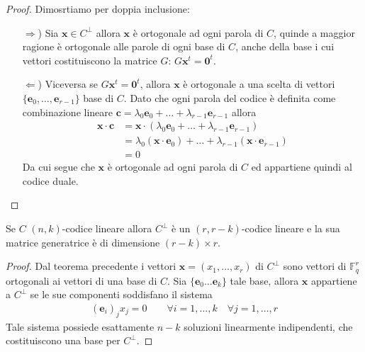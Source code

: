 \begin{proof}
   Dimosrtiamo per doppia inclusione:
   \begin{itemize}
   \item[$\Rightarrow$)] Sia $\mathbf{x} \in C^{\perp}$ allora $\mathbf{x}$ è ortogonale ad ogni parola di $C$, quinde a maggior ragione è ortogonale alle parole di ogni base di $C$, anche della base i cui vettori costituiscono la matrice $G$: $G \mathbf{x}^{t} = \mathbf{0}^{t}$.
   \item[$\Leftarrow$)] Viceversa se $G \mathbf{x}^{t} = \mathbf{0}^{t}$, allora $\mathbf{x}$ è ortogonale a una scelta di vettori $\lbrace \mathbf{e}_{0}, \dots , \mathbf{e}_{r-1} \rbrace$ base di $C$. Dato che ogni parola del codice è definita come combinazione lineare  $\mathbf{c} = \lambda_{0} \mathbf{e}_{0} + \dots + \lambda_{r-1} \mathbf{e}_{r-1}$ allora
   \begin{align*}
      \mathbf{x} \cdot \mathbf{c} 
      &= \mathbf{x} \cdot ( \lambda_{0} \mathbf{e}_{0} + \dots + \lambda_{r-1} \mathbf{e}_{r-1}) \\
      &= \lambda_{0} (\mathbf{x} \cdot  \mathbf{e}_{0}) + \dots + \lambda_{r-1} (\mathbf{x} \cdot \mathbf{e}_{r-1})\\
      &= 0
   \end{align*}
   Da cui segue che $\mathbf{x}$ è ortogonale ad ogni parola di $C$ ed appartiene quindi al codice duale.
\end{itemize}
\end{proof}
\begin{corollario}
   Se $C$ $(n,k)$-codice lineare allora $C^{\perp}$ è un $(r,r-k)$-codice lineare e la sua matrice generatrice è di dimensione $(r-k)\times r$.
\end{corollario}
\begin{proof}
   Dal teorema precedente i vettori $\mathbf{x} = (x_{1}, \dots , x_{r})$ di $C^{\perp}$ sono vettori di $\mathbb{F}_{q}^{r}$ ortogonali ai vettori di una base di $C$. Sia $\lbrace \mathbf{e}_{0} \dots \mathbf{e}_{k} \rbrace $ tale base, allora $\mathbf{x}$ appartiene a $C^{\perp}$ se le sue componenti soddisfano il sistema
   \begin{align*}
      (\mathbf{e}_{i})_{j} x_{j} = 0 \qquad \forall i = 1, \dots , k \quad \forall j=1, \dots, r
   \end{align*}
   Tale sistema possiede esattamente $n-k$ soluzioni linearmente indipendenti, che costituiscono una base per $C^{\perp}$.
\end{proof}

